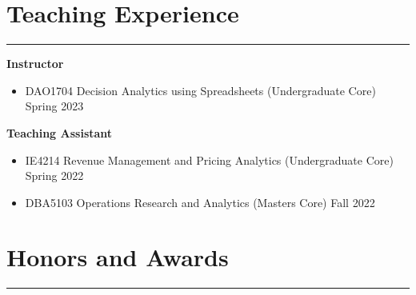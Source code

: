 \documentclass[12pt, a4paper]{article}
\begin{document}
{%





\section*{Teaching Experience}
\vspace*{0.4em}
\hrule height 0.5pt

\raggedright\textbf{Instructor}
\begin{itemize}[leftmargin=26pt, itemsep=2pt, parsep=0pt, topsep=-0.5em]

	\item DAO1704 Decision Analytics using Spreadsheets (Undergraduate Core) \hfill Spring 2023

\end{itemize}

\raggedright\textbf{Teaching Assistant}
\begin{itemize}[leftmargin=26pt, itemsep=2pt, parsep=0pt, topsep=-0.5em]

	\item IE4214 Revenue Management and Pricing Analytics (Undergraduate Core) \hfill Spring 2022

	\item DBA5103 Operations Research and Analytics (Masters Core) \hfill Fall 2022

\end{itemize}




\section*{Honors and Awards}
\vspace*{0.4em}
\hrule height 0.5pt
\begin{itemize}[leftmargin=26pt, itemsep=1pt, parsep=0.5pt, topsep=1pt]


\end{itemize}}
\end{document}
